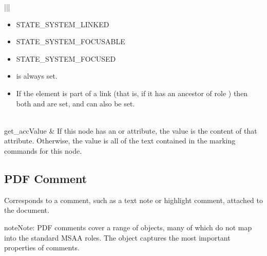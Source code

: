 \documentclass[letterpaper,12pt,english,openany,oneside]{sphinxmanual}
\begin{document}
\begin{savenotes}
\begin{tabular}[t]{|*{2}{|}}
\begin{itemize}
\item {} 
STATE\_SYSTEM\_LINKED

\item {} 
STATE\_SYSTEM\_FOCUSABLE

\item {} 
STATE\_SYSTEM\_FOCUSED

\end{itemize}
\begin{itemize}
\item {} 
 is always set.

\item {} 
If the element is part of a link (that is, if it has an ancestor of role  ) then both  and  are set, and  can also be set.

\end{itemize}
\\
\hline
get\_accValue
&
If this node has an  or  attribute, the value is the content of that attribute. Otherwise, the value is all of the text contained in the marking commands for this node.
\\
\hline
\end{tabular}
\par
\sphinxattableend\end{savenotes}




\subsection{PDF Comment}
\label{\detokenize{MSAA_PDF:pdf-comment}}
Corresponds to a comment, such as a text note or highlight comment, attached to the document.

\begin{sphinxadmonition}{note}{Note:}
PDF comments cover a range of objects, many of which do not map into the standard MSAA roles. The  object captures the most important properties of comments.
\end{sphinxadmonition}
\end{document}
